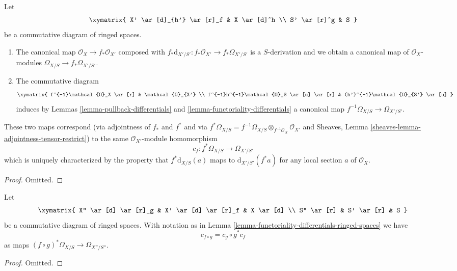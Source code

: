 \begin{lemma}
\label{lemma-functoriality-differentials-ringed-spaces}
Let
$$
\xymatrix{
X' \ar[d]_{h'} \ar[r]_f & X \ar[d]^h \\
S' \ar[r]^g & S
}
$$
be a commutative diagram of ringed spaces.
\begin{enumerate}
\item The canonical map $\mathcal{O}_X \to f_*\mathcal{O}_{X'}$ composed with
$f_*\text{d}_{X'/S'} : f_*\mathcal{O}_{X'} \to f_*\Omega_{X'/S'}$ is a
$S$-derivation and we obtain a canonical map of $\mathcal{O}_X$-modules
$\Omega_{X/S} \to f_*\Omega_{X'/S'}$.
\item The commutative diagram
$$
\xymatrix{
f^{-1}\mathcal{O}_X \ar[r] & \mathcal{O}_{X'} \\
f^{-1}h^{-1}\mathcal{O}_S \ar[u] \ar[r] & (h')^{-1}\mathcal{O}_{S'} \ar[u]
}
$$
induces by Lemmas \ref{lemma-pullback-differentials} and
\ref{lemma-functoriality-differentials}
a canonical map $f^{-1}\Omega_{X/S} \to \Omega_{X'/S'}$.
\end{enumerate}
These two maps correspond (via adjointness of $f_*$ and $f^*$ and
via $f^*\Omega_{X/S} =
f^{-1}\Omega_{X/S} \otimes_{f^{-1}\mathcal{O}_X} \mathcal{O}_{X'}$ and
Sheaves, Lemma \ref{sheaves-lemma-adjointness-tensor-restrict})
to the same $\mathcal{O}_{X'}$-module homomorphism
$$
c_f : f^*\Omega_{X/S} \longrightarrow \Omega_{X'/S'}
$$
which is uniquely characterized by the property that
$f^*\text{d}_{X/S}(a)$ maps to $\text{d}_{X'/S'}(f^*a)$
for any local section $a$ of $\mathcal{O}_X$.
\end{lemma}

\begin{proof}
Omitted.
\end{proof}

\begin{lemma}
\label{lemma-check-functoriality-differentials}
Let
$$
\xymatrix{
X'' \ar[d] \ar[r]_g & X' \ar[d] \ar[r]_f & X \ar[d] \\
S'' \ar[r] & S' \ar[r] & S
}
$$
be a commutative diagram of ringed spaces. With notation as in
Lemma \ref{lemma-functoriality-differentials-ringed-spaces} we have
$$
c_{f \circ g} = c_g \circ g^* c_f
$$
as maps $(f \circ g)^*\Omega_{X/S} \to \Omega_{X''/S''}$.
\end{lemma}

\begin{proof}
Omitted.
\end{proof}
















